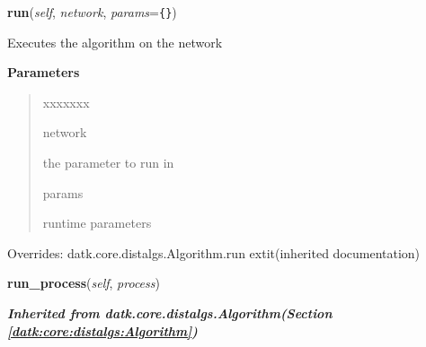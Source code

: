 \hspace{.8\funcindent}\begin{boxedminipage}{\funcwidth}

    \raggedright \textbf{run}(\textit{self}, \textit{network}, \textit{params}={\tt \texttt{\{}\texttt{\}}})

\setlength{\parskip}{2ex}
    Executes the algorithm on the network

\setlength{\parskip}{1ex}
      \textbf{Parameters}
      \vspace{-1ex}

      \begin{quote}
        \begin{Ventry}{xxxxxxx}

          \item[network]

          the parameter to run in

          \item[params]

          runtime parameters

        \end{Ventry}

      \end{quote}

      Overrides: datk.core.distalgs.Algorithm.run 	extit{(inherited documentation)}

    \end{boxedminipage}

    \label{datk:core:distalgs:Asynchronous_Algorithm:run_process}

    \vspace{0.5ex}

\hspace{.8\funcindent}\begin{boxedminipage}{\funcwidth}

    \raggedright \textbf{run\_process}(\textit{self}, \textit{process})

\setlength{\parskip}{2ex}
\setlength{\parskip}{1ex}
    \end{boxedminipage}


\large{\textbf{\textit{Inherited from datk.core.distalgs.Algorithm\textit{(Section \ref{datk:core:distalgs:Algorithm})}}}}

